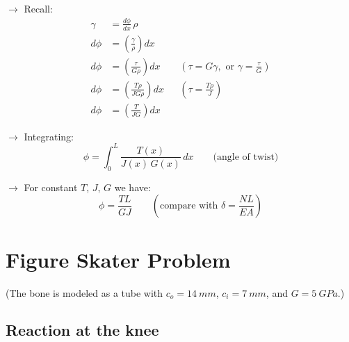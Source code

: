 \documentclass[11pt]{article}
\begin{document}

\noindent
$\rightarrow$ Recall:
\begin{align*}
  \gamma &= \frac{d\phi}{dx}\,\rho \\
  d\phi &= \left(\frac{\gamma}{\rho}\right)dx \\
  d\phi &= \left(\frac{\tau}{G\rho}\right)dx
     && \left(\tau = G\gamma, \text{ or } \gamma = \frac{\tau}{G}\right) \\
  d\phi &= \left(\frac{T\rho}{JG\rho}\right)dx
     && \left(\tau = \frac{T\rho}{J}\right) \\
  d\phi &= \left(\frac{T}{JG}\right)dx
\end{align*}

\noindent
$\rightarrow$ Integrating:
\[
  \boxed{\phi = \int_0^L \frac{T(x)}{J(x)\,G(x)}\,dx} \qquad \text{(angle of twist)}
\]

\noindent
$\rightarrow$ For constant $T$, $J$, $G$ we have:
\[
  \boxed{\phi = \frac{TL}{GJ}} \qquad
  \left(\text{compare with } \delta = \frac{NL}{EA}\right)
\]

\section*{Figure Skater Problem}

\begin{center}
\end{center}

\noindent
(The bone is modeled as a tube with $c_o = \SI{14}{mm}$, $c_i = \SI{7}{mm}$, and
$G = \SI{5}{GPa}$.)

\subsection*{Reaction at the knee}
\end{document}
